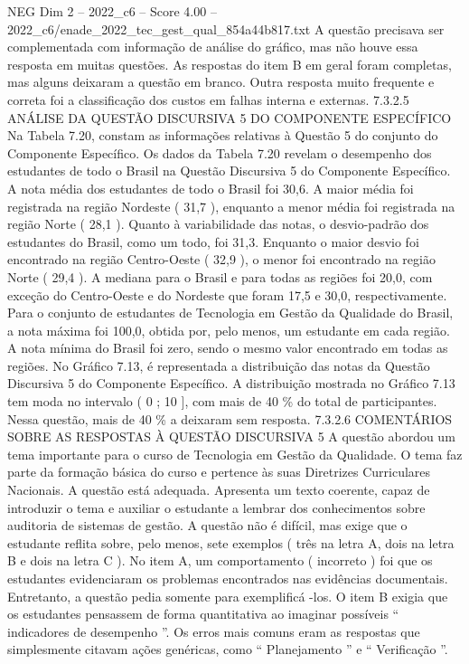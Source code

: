\begin{textsample}{NEG Dim 2 – 2022\_c6 – Score 4.00 – 2022\_c6/enade\_2022\_tec\_gest\_qual\_854a44b817.txt}
A questão precisava ser complementada com informação de análise do gráfico, mas não houve essa resposta em muitas questões.
As respostas do item B em geral foram completas, mas alguns deixaram a questão em branco.
Outra resposta muito frequente e correta foi a classificação dos custos em falhas interna e externas. 7.3.2.5 ANÁLISE DA QUESTÃO DISCURSIVA 5 DO COMPONENTE ESPECÍFICO Na Tabela 7.20, constam as informações relativas à Questão 5 do conjunto do Componente Específico.
Os dados da Tabela 7.20 revelam o desempenho dos estudantes de todo o Brasil na Questão Discursiva 5 do Componente Específico.
A nota média dos estudantes de todo o Brasil foi 30,6.
A maior média foi registrada na região Nordeste ( 31,7 ), enquanto a menor média foi registrada na região Norte ( 28,1 ).
Quanto à variabilidade das notas, o desvio-padrão dos estudantes do Brasil, como um todo, foi 31,3.
Enquanto o maior desvio foi encontrado na região Centro-Oeste ( 32,9 ), o menor foi encontrado na região Norte ( 29,4 ).
A mediana para o Brasil e para todas as regiões foi 20,0, com exceção do Centro-Oeste e do Nordeste que foram 17,5 e 30,0, respectivamente.
Para o conjunto de estudantes de Tecnologia em Gestão da Qualidade do Brasil, a nota máxima foi 100,0, obtida por, pelo menos, um estudante em cada região.
A nota mínima do Brasil foi zero, sendo o mesmo valor encontrado em todas as regiões.
No Gráfico 7.13, é representada a distribuição das notas da Questão Discursiva 5 do Componente Específico.
A distribuição mostrada no Gráfico 7.13 tem moda no intervalo ( 0 ; 10 ], com mais de 40 \% do total de participantes.
Nessa questão, mais de 40 \% a deixaram sem resposta. 7.3.2.6 COMENTÁRIOS SOBRE AS RESPOSTAS À QUESTÃO DISCURSIVA 5 A questão abordou um tema importante para o curso de Tecnologia em Gestão da Qualidade.
O tema faz parte da formação básica do curso e pertence às suas Diretrizes Curriculares Nacionais.
A questão está adequada.
Apresenta um texto coerente, capaz de introduzir o tema e auxiliar o estudante a lembrar dos conhecimentos sobre auditoria de sistemas de gestão.
A questão não é difícil, mas exige que o estudante reflita sobre, pelo menos, sete exemplos ( três na letra A, dois na letra B e dois na letra C ).
No item A, um comportamento ( incorreto ) foi que os estudantes evidenciaram os problemas encontrados nas evidências documentais.
Entretanto, a questão pedia somente para exemplificá -los.
O item B exigia que os estudantes pensassem de forma quantitativa ao imaginar possíveis “ indicadores de desempenho ”.
Os erros mais comuns eram as respostas que simplesmente citavam ações genéricas, como “ Planejamento ” e “ Verificação ”.

\end{textsample}
